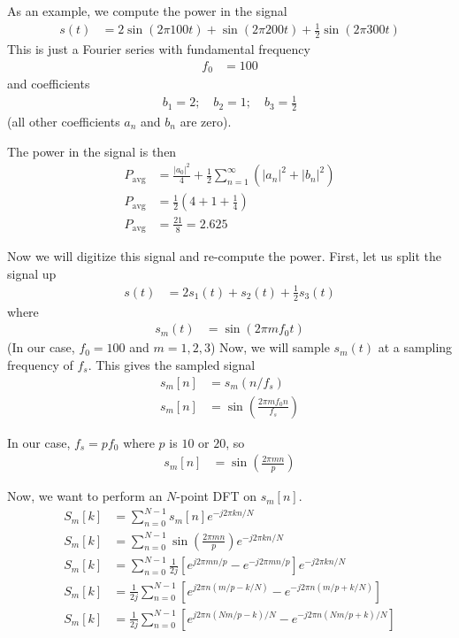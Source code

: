 \documentclass[twocolumn]{myarticle}
\begin{document}
As an example, we compute the power in the signal
\begin{align}
    s(t) &= 2 \sin(2 \pi 100 t) + \sin(2 \pi 200 t) + \frac{1}{2} \sin(2 \pi 300 t)
\end{align}
This is just a Fourier series with fundamental frequency
\begin{align}
    f_0 &= 100
\end{align}
and coefficients
\begin{align}
    b_1 = 2; \quad b_2 = 1; \quad b_3 = \frac{1}{2} 
\end{align}
(all other coefficients $ a_n $ and $ b_n $ are zero).

The power in the signal is then
\begin{align}
    P_\text{avg} &= \frac{|a_0|^2}{4} + \frac{1}{2} \sum_{n=1}^{\infty} \left( |a_n|^2 + |b_n|^2 \right)
    \\
    P_\text{avg} &= \frac{1}{2} \left( 4 + 1 + \frac{1}{4} \right)
    \\
    P_\text{avg} &= \frac{21}{8} = 2.625
\end{align}

Now we will digitize this signal and re-compute the power.
First, let us split the signal up
\begin{align}
    s(t) &= 2 s_1(t) + s_2(t) + \frac{1}{2} s_3(t)
\end{align}
where
\begin{align}
    s_m(t) &= \sin(2 \pi m f_0 t)
\end{align}
(In our case, $ f_0 = 100 $ and $ m = 1, 2, 3 $)
Now, we will sample $ s_m(t) $ at a sampling frequency of $ f_s $.
This gives the sampled signal
\begin{align}
    s_m[n] &= s_m(n/f_s)
    \\
    s_m[n] &= \sin\left(\frac{2 \pi m f_0 n}{f_s}\right)
\end{align}


In our case, $ f_s = p f_0 $ where $ p $ is $ 10 $ or $ 20 $, so
\begin{align}
    s_m[n] &= \sin\left(\frac{2 \pi m n}{p}\right)
\end{align}

Now, we want to perform an $ N $-point DFT on $ s_m[n] $.
\begin{align}
    S_m[k] &= \sum_{n=0}^{N-1} s_m[n] e^{-j 2 \pi k n / N}
    \\
    S_m[k] &= \sum_{n=0}^{N-1} \sin\left(\frac{2 \pi m n}{p}\right) e^{-j 2 \pi k n / N}
    \\
    S_m[k] &= \sum_{n=0}^{N-1} \frac{1}{2j} \left[ e^{j 2 \pi m n/p} - e^{-j2 \pi m n / p} \right] e^{-j 2 \pi k n / N}
    \\
    S_m[k] &= \frac{1}{2j} \sum_{n=0}^{N-1} \left[ e^{j 2 \pi n (m/p - k/N)} - e^{-j 2 \pi n (m/p + k/N)} \right]
    \\
    S_m[k] &= \frac{1}{2j} \sum_{n=0}^{N-1} \left[ e^{j 2 \pi n (Nm/p - k)/N} - e^{-j 2 \pi n (Nm/p + k)/N} \right]
\end{align}
\end{document}
